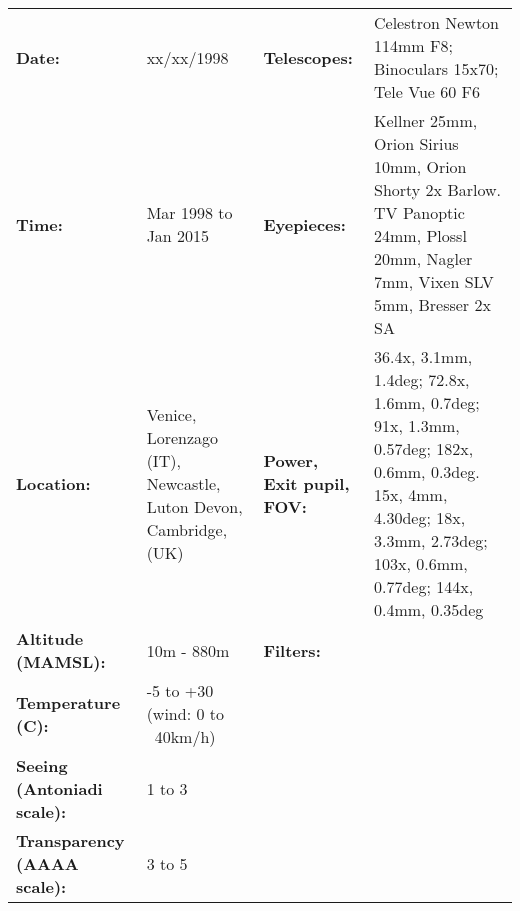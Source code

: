 \begin{tabular}{ p{1.7in} p{1.2in} p{1.5in} p{4.2in}}
{\bf Date:} & xx/xx/1998 & {\bf Telescopes:} & Celestron Newton 114mm F8; Binoculars 15x70; Tele Vue 60 F6 \\ 
{\bf Time:} & Mar 1998 to Jan 2015 & {\bf Eyepieces:} & Kellner 25mm, Orion Sirius 10mm, Orion Shorty 2x Barlow. TV Panoptic 24mm, Plossl 20mm, Nagler 7mm, Vixen SLV 5mm, Bresser 2x SA \\ 
{\bf Location:} & Venice, Lorenzago (IT), Newcastle, Luton Devon, Cambridge, (UK) & {\bf Power, Exit pupil, FOV:} & 36.4x, 3.1mm, 1.4deg; 72.8x, 1.6mm, 0.7deg; 91x, 1.3mm, 0.57deg; 182x, 0.6mm, 0.3deg. 15x, 4mm, 4.30deg; 18x, 3.3mm, 2.73deg; 103x, 0.6mm, 0.77deg; 144x, 0.4mm, 0.35deg \\ 
{\bf Altitude (MAMSL):} & 10m - 880m & {\bf Filters:} &  \\ 
{\bf Temperature (C):} & -5 to +30 (wind: 0 to ~40km/h) & & \\ 
{\bf Seeing (Antoniadi scale):} & 1 to 3 & & \\ 
{\bf Transparency (AAAA scale):} & 3 to 5 & & \\ 
\end{tabular}
\centering 
